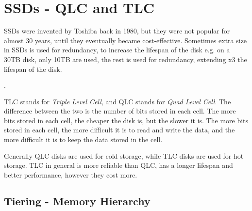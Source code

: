       
\section{SSDs - QLC and TLC}
SSDs were invented by Toshiba back in 1980, but they were not popular for almost 30 years, until they eventually became cost-effective. Sometimes extra size in SSDs is used for redundancy, to increase the lifespan of the disk e.g. on a 30TB disk, only 10TB are used, the rest is used for redundancy, extending x3 the lifespan of the disk.

.

TLC stands for \textit{Triple Level Cell}, and QLC stands for \textit{Quad Level Cell}. The difference between the two is the number of bits stored in each cell. The more bits stored in each cell, the cheaper the disk is, but the slower it is. The more bits stored in each cell, the more difficult it is to read and write the data, and the more difficult it is to keep the data stored in the cell.

Generally QLC disks are used for cold storage, while TLC disks are used for hot storage.
TLC in general is more reliable than QLC, has a longer lifespan and better performance, however they cost more.
\subsection{Tiering - Memory Hierarchy}

